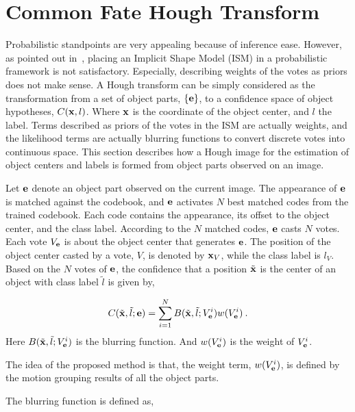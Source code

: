 \section{Common Fate Hough Transform}
\label{pip4}

Probabilistic standpoints are very appealing because of inference ease. However, as pointed out in~\citep{ac27}, placing an Implicit Shape Model (ISM) in a probabilistic framework is not satisfactory. Especially, describing weights of the votes as priors does not make sense.
A Hough transform can be simply considered as the transformation from a set of  object parts, $\{\bf{e}\}$,  to a confidence space of object hypotheses, $C({\bf{x}},l)$. Where $\bf{x}$ is the coordinate of the object center, and $l$ the label. Terms described as priors of the votes in the ISM are actually weights, and the likelihood terms are actually blurring functions to convert discrete votes into continuous space. This section describes how a Hough image for the estimation of object centers and labels is formed from object parts observed on an image.



Let $\bf{e}$ denote an object part observed on the current image. The appearance of $\bf{e}$ is matched against the codebook, and $\bf{e}$ activates $N$ best matched codes from the trained codebook. Each code contains the appearance, its offset to the object center, and the class label. According to the $N$ matched codes, $\bf{e}$ casts $N$ votes. Each vote $V_{\bf{e}}$ is about the object center that generates $\bf{e}$. The position of the object center casted by  a vote, $V$, is denoted by ${\bf{x}}_V$, while the class label is $l_V$. Based on the $N$ votes of $\bf{e}$, the confidence that a position $\tilde{\bf{x}}$ is the center of an object with class label $\tilde{l}$ is given by,



\begin{equation}C({\tilde{\bf{x}}},\tilde{l};{\bf{e}}) = \sum\limits^N_{i=1} {B({\tilde{\bf{x}}},{\tilde{l}};{V_{\bf{e}}^i}) w({V_{\bf{e}}^i})}\:.
\label{eq1}
\end{equation}
Here $B({\tilde{\bf{x}}},{\tilde{l}};{V_{\bf{e}}^i})$ is the blurring function. And $w({V_{\bf{e}}^i})$ is the weight of ${V_{\bf{e}}^i}$.

The idea of the proposed method is that, the weight term, $w({V_{\bf{e}}^i})$, is defined by the motion grouping results of all the object parts.

The blurring function is defined as,

